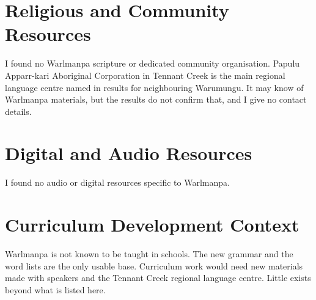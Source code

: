 \documentclass[12pt]{article}
\begin{document}
\section{Religious and Community Resources}
I found no Warlmanpa scripture or dedicated community organisation. Papulu Apparr-kari Aboriginal Corporation in Tennant Creek is the main regional language centre named in results for neighbouring Warumungu. It may know of Warlmanpa materials, but the results do not confirm that, and I give no contact details.

\section{Digital and Audio Resources}
I found no audio or digital resources specific to Warlmanpa.

\section{Curriculum Development Context}
Warlmanpa is not known to be taught in schools. The new grammar and the word lists are the only usable base. Curriculum work would need new materials made with speakers and the Tennant Creek regional language centre. Little exists beyond what is listed here.
\end{document}
